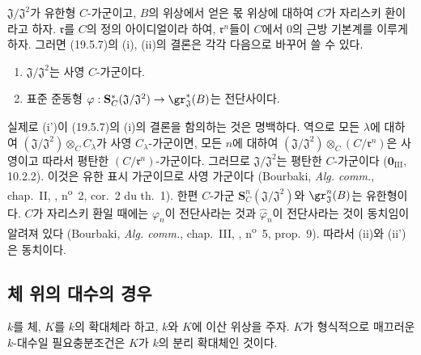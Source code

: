 \begin{remark}[19.5.8]
\label{0.19.5.8-ko}
$\mathfrak J/\mathfrak J^2$가 유한형 $C$-가군이고, $B$의 위상에서 얻은
몫 위상에 대하여 $C$가 자리스키 환이라고 하자. $\mathfrak r$를
$C$의 정의 아이디얼이라 하여, $\mathfrak r^n$들이 $C$에서 $0$의
근방 기본계를 이루게 하자. 그러면 (19.5.7)의 (i), (ii)의 결론은
각각 다음으로 바꾸어 쓸 수 있다.
\begin{enumerate}
  \item[\rm(i')] $\mathfrak J/\mathfrak J^2$는 사영 $C$-가군이다.
  \item[\rm(ii')] 표준 준동형
  $\varphi:\mathbf S_C^*(\mathfrak J/\mathfrak J^2)
  \to\gr_{\mathfrak J}^*(B)$는 전단사이다.
\end{enumerate}
실제로 (i')이 (19.5.7)의 (i)의 결론을 함의하는 것은 명백하다.
역으로 모든 $\lambda$에 대하여
$(\mathfrak J/\mathfrak J^2)\otimes_C C_\lambda$가 사영
$C_\lambda$-가군이면, 모든 $n$에 대하여
$(\mathfrak J/\mathfrak J^2)\otimes_C(C/\mathfrak r^n)$은 사영이고
따라서 평탄한 $(C/\mathfrak r^n)$-가군이다. 그러므로
$\mathfrak J/\mathfrak J^2$는 평탄한 $C$-가군이다
($\mathbf 0_{\mathrm{III}}$, 10.2.2). 이것은 유한 표시 가군이므로
사영 가군이다 (Bourbaki, \emph{Alg. comm.}, chap.~II, ,
n\textsuperscript{o}~2, cor.~2 du th.~1). 한편 $C$-가군
$\mathbf S_C^n(\mathfrak J/\mathfrak J^2)$와
$\gr_{\mathfrak J}^n(B)$는 유한형이다. $C$가 자리스키 환일 때에는
$\varphi_n$이 전단사라는 것과 $\widehat\varphi_n$이 전단사라는 것이
동치임이 알려져 있다 (Bourbaki, \emph{Alg. comm.}, chap.~III,
, n\textsuperscript{o}~5, prop.~9). 따라서 (ii)와 (ii')은
동치이다.
\end{remark}

\subsection{체 위의 대수의 경우}
\label{subsection:0.19.6-ko}

\begin{theorem}[19.6.1 (Cohen)]
\label{0.19.6.1-ko}
$k$를 체, $K$를 $k$의 확대체라 하고, $k$와 $K$에 이산 위상을 주자.
$K$가 형식적으로 매끄러운 $k$-대수일 필요충분조건은 $K$가 $k$의
분리 확대체인 것이다.
\end{theorem}

